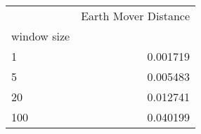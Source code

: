 \begin{tabular}{lr}
\toprule
{} &  Earth Mover Distance \\
window size &                       \\
\midrule
1           &              0.001719 \\
5           &              0.005483 \\
20          &              0.012741 \\
100         &              0.040199 \\
\bottomrule
\end{tabular}
